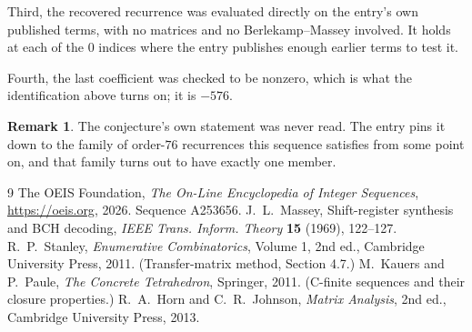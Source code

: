 \documentclass[11pt,a4paper]{article}
\theoremstyle{plain}
\theoremstyle{definition}
\newtheorem{remark}[theorem]{Remark}
\begin{document}
Third, the recovered recurrence was evaluated directly on the entry's own published terms, with
no matrices and no Berlekamp--Massey involved. It holds at each of the $0$ indices where
the entry publishes enough earlier terms to test it.

Fourth, the last coefficient was checked to be nonzero, which is what the identification above
turns on; it is $-576$.

\begin{remark}
The conjecture's own statement was never read. The entry pins it down to the family of
order-$76$ recurrences this sequence satisfies from some point on, and that family turns
out to have exactly one member.
\end{remark}

\begin{thebibliography}{9}
 The OEIS Foundation, \emph{The On-Line Encyclopedia of Integer
Sequences}, \url{https://oeis.org}, 2026. Sequence A253656.
 J.~L.~Massey, Shift-register synthesis and BCH decoding, \emph{IEEE
Trans. Inform. Theory} \textbf{15} (1969), 122--127.
 R.~P.~Stanley, \emph{Enumerative Combinatorics}, Volume 1, 2nd ed.,
Cambridge University Press, 2011. (Transfer-matrix method, Section 4.7.)
 M.~Kauers and P.~Paule, \emph{The Concrete Tetrahedron}, Springer, 2011.
(C-finite sequences and their closure properties.)
 R.~A.~Horn and C.~R.~Johnson, \emph{Matrix Analysis}, 2nd ed., Cambridge
University Press, 2013.
\end{thebibliography}
\end{document}
